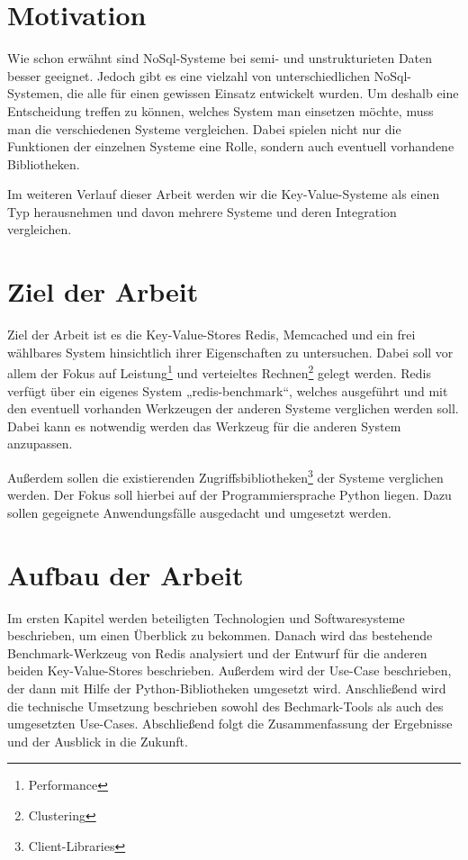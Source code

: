 \section{Motivation}

Wie schon erwähnt sind NoSql-Systeme bei semi- und unstrukturieten Daten besser
geeignet. Jedoch gibt es eine vielzahl von unterschiedlichen NoSql-Systemen,
die alle für einen gewissen Einsatz entwickelt wurden. Um deshalb eine
Entscheidung treffen zu können, welches System man einsetzen möchte, muss man
die verschiedenen Systeme vergleichen. Dabei spielen nicht nur die Funktionen
der einzelnen Systeme eine Rolle, sondern auch eventuell vorhandene
Bibliotheken.

Im weiteren Verlauf dieser Arbeit werden wir die Key-Value-Systeme als einen
Typ herausnehmen und davon mehrere Systeme und deren Integration vergleichen.

\section{Ziel der Arbeit}

Ziel der Arbeit ist es die Key-Value-Stores Redis, Memcached und ein frei
wählbares System hinsichtlich ihrer Eigenschaften zu untersuchen. Dabei soll
vor allem der Fokus auf Leistung\footnote{Performance} und verteieltes
Rechnen\footnote{Clustering} gelegt werden. Redis verfügt über ein
eigenes System „redis-benchmark“, welches ausgeführt und mit den eventuell
vorhanden Werkzeugen der anderen Systeme verglichen werden soll. Dabei kann es
notwendig werden das Werkzeug für die anderen System anzupassen.

Außerdem sollen die existierenden
Zugriffsbibliotheken\footnote{Client-Libraries} der Systeme verglichen
werden. Der Fokus soll hierbei auf der Programmiersprache Python liegen. Dazu
sollen gegeignete Anwendungsfälle ausgedacht und umgesetzt werden.

\section{Aufbau der Arbeit}


Im ersten Kapitel werden beteiligten Technologien und Softwaresysteme
beschrieben, um einen Überblick zu bekommen. Danach wird das bestehende
Benchmark-Werkzeug von Redis analysiert und der Entwurf für die anderen beiden
Key-Value-Stores beschrieben. Außerdem wird der Use-Case beschrieben, der dann
mit Hilfe der Python-Bibliotheken umgesetzt wird. Anschließend wird die
technische Umsetzung beschrieben sowohl des Bechmark-Tools als auch des
umgesetzten Use-Cases. Abschließend folgt die Zusammenfassung der Ergebnisse
und der Ausblick in die Zukunft.
